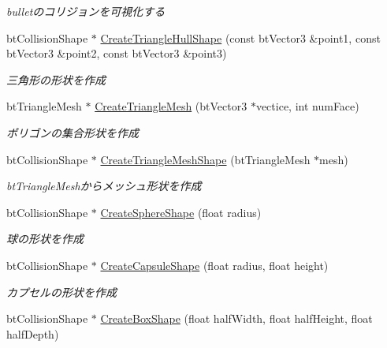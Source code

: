 \begin{DoxyCompactItemize}
\begin{DoxyCompactList}\small\item\em bulletのコリジョンを可視化する \end{DoxyCompactList}\item 
bt\+Collision\+Shape $\ast$ \mbox{\hyperlink{class_k___physics_1_1_bullet_physics_a70d73ada453638ed643a117b6b2a9809}{Create\+Triangle\+Hull\+Shape}} (const bt\+Vector3 \&point1, const bt\+Vector3 \&point2, const bt\+Vector3 \&point3)
\begin{DoxyCompactList}\small\item\em 三角形の形状を作成 \end{DoxyCompactList}\item 
bt\+Triangle\+Mesh $\ast$ \mbox{\hyperlink{class_k___physics_1_1_bullet_physics_a22e01fd34d8040fb70f4ccf12d69969e}{Create\+Triangle\+Mesh}} (bt\+Vector3 $\ast$vectice, int num\+Face)
\begin{DoxyCompactList}\small\item\em ポリゴンの集合形状を作成 \end{DoxyCompactList}\item 
bt\+Collision\+Shape $\ast$ \mbox{\hyperlink{class_k___physics_1_1_bullet_physics_ad78ad1e12f268bac61731b636ea040b4}{Create\+Triangle\+Mesh\+Shape}} (bt\+Triangle\+Mesh $\ast$mesh)
\begin{DoxyCompactList}\small\item\em bt\+Triangle\+Meshからメッシュ形状を作成 \end{DoxyCompactList}\item 
bt\+Collision\+Shape $\ast$ \mbox{\hyperlink{class_k___physics_1_1_bullet_physics_af6f877441f5b5d7da250bcc39a694273}{Create\+Sphere\+Shape}} (float radius)
\begin{DoxyCompactList}\small\item\em 球の形状を作成 \end{DoxyCompactList}\item 
bt\+Collision\+Shape $\ast$ \mbox{\hyperlink{class_k___physics_1_1_bullet_physics_a67e200395443fdfb27aef63b0e154078}{Create\+Capsule\+Shape}} (float radius, float height)
\begin{DoxyCompactList}\small\item\em カプセルの形状を作成 \end{DoxyCompactList}\item 
bt\+Collision\+Shape $\ast$ \mbox{\hyperlink{class_k___physics_1_1_bullet_physics_a12af3e18b74c5dd8bf6a866f6eb1df03}{Create\+Box\+Shape}} (float half\+Width, float half\+Height, float half\+Depth)

\end{DoxyCompactItemize}
